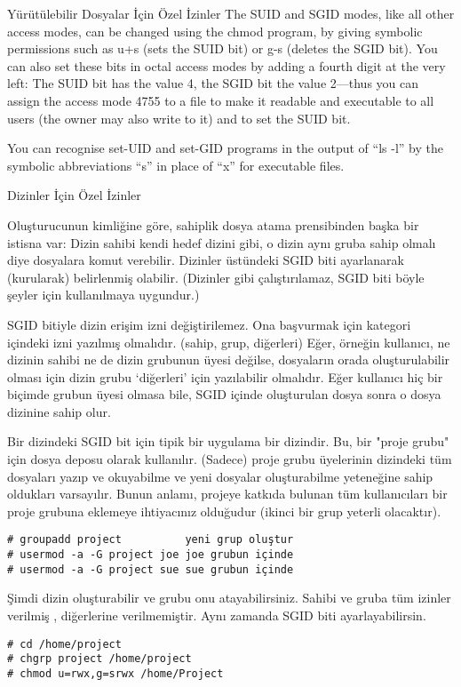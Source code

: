 \begin{section}{Yürütülebilir Dosyalar İçin Özel İzinler}
The SUID and SGID modes, like all other access modes, can be changed using the chmod program, by giving symbolic permissions such as u+s (sets the SUID bit) or g-s (deletes the SGID bit). You can also set these bits in octal access modes by adding a fourth digit at the very left: The SUID bit has the value 4, the SGID bit the value 2—thus you can assign the access mode 4755 to a file to make it readable and executable to all users (the owner may also write to it) and to set the SUID bit.

You can recognise set-UID and set-GID programs in the output of “ls -l” by the symbolic abbreviations “s” in place of “x” for executable files.
\end{section}
\begin{section}{Dizinler İçin Özel İzinler}

Oluşturucunun kimliğine göre, sahiplik dosya atama prensibinden başka bir istisna var: Dizin sahibi kendi hedef dizini gibi, o dizin aynı gruba sahip olmalı diye dosyalara komut verebilir. Dizinler üstündeki SGID biti ayarlanarak (kurularak) belirlenmiş olabilir. (Dizinler gibi çalıştırılamaz, SGID biti böyle şeyler için kullanılmaya uygundur.)

SGID bitiyle dizin erişim izni değiştirilemez. Ona başvurmak için kategori içindeki izni yazılmış olmalıdır. (sahip, grup, diğerleri) Eğer, örneğin kullanıcı, ne dizinin sahibi ne de dizin grubunun üyesi değilse, dosyaların orada oluşturulabilir olması için dizin grubu ‘diğerleri’ için yazılabilir olmalıdır. Eğer kullanıcı hiç bir biçimde grubun üyesi olmasa bile, SGID içinde oluşturulan dosya sonra o dosya dizinine sahip olur.

Bir dizindeki SGID bit için tipik bir uygulama bir dizindir. Bu, bir "proje grubu" için dosya deposu olarak kullanılır. (Sadece) proje grubu üyelerinin dizindeki tüm dosyaları yazıp ve okuyabilme ve yeni dosyalar oluşturabilme yeteneğine sahip oldukları varsayılır. Bunun anlamı, projeye katkıda bulunan tüm kullanıcıları bir proje grubuna eklemeye ihtiyacınız olduğudur (ikinci bir grup yeterli olacaktır).
\begin{verbatim}
# groupadd project          yeni grup oluştur
# usermod -a -G project joe joe grubun içinde
# usermod -a -G project sue sue grubun içinde
\end{verbatim}

Şimdi dizin oluşturabilir ve grubu onu atayabilirsiniz. Sahibi ve gruba tüm izinler verilmiş , diğerlerine verilmemiştir. Aynı zamanda SGID biti ayarlayabilirsin.
\begin{verbatim}
# cd /home/project
# chgrp project /home/project
# chmod u=rwx,g=srwx /home/Project
\end{verbatim}


\end{section}
